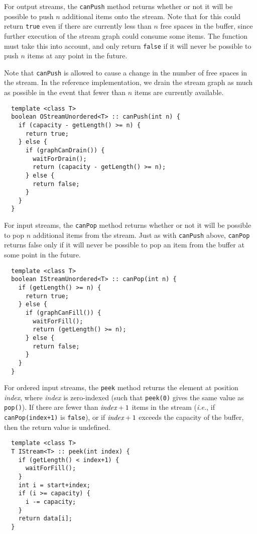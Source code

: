  For output streams, the {\tt canPush} method returns
whether or not it will be possible to push $n$ additional items onto
the stream.  Note that for this could return {\tt true} even if there
are currently less than $n$ free spaces in the buffer, since further
execution of the stream graph could consume some items.  The function
must take this into account, and only return {\tt false} if it will
never be possible to push $n$ items at any point in the future.

Note that {\tt canPush} is allowed to cause a change in the number of
free spaces in the stream.  In the reference implementation, we drain
the stream graph as much as possible in the event that fewer than $n$
items are currently available.

{\small
\begin{verbatim}
  template <class T>
  boolean OStreamUnordered<T> :: canPush(int n) {
    if (capacity - getLength() >= n) {
      return true;
    } else {
      if (graphCanDrain()) {
        waitForDrain();
        return (capacity - getLength() >= n);
      } else {
        return false;
      }
    }
  }
\end{verbatim}}

 For input streams, the {\tt canPop} method returns
whether or not it will be possible to pop $n$ additional items from
the stream.  Just as with {\tt canPush} above, {\tt canPop} returns
false only if it will never be possible to pop an item from the buffer
at some point in the future.

{\small
\begin{verbatim}
  template <class T>
  boolean IStreamUnordered<T> :: canPop(int n) {
    if (getLength() >= n) {
      return true;
    } else {
      if (graphCanFill()) {
        waitForFill();
        return (getLength() >= n);
      } else {
        return false;
      }
    }
  }
\end{verbatim}}

 For ordered input streams, the {\tt peek} method returns
the element at position {\it index}, where {\it index} is zero-indexed
(such that {\tt peek(0)} gives the same value as {\tt pop()}).  If
there are fewer than $\mbox{\it index}+1$ items in the stream ({\it i.e.},
if {\tt canPop(index+1)} is {\tt false}), or if $\mbox{\it index}+1$ exceeds
the capacity of the buffer, then the return value is undefined.

{\small
\begin{verbatim}
  template <class T>
  T IStream<T> :: peek(int index) {
    if (getLength() < index+1) {
      waitForFill();
    }
    int i = start+index;
    if (i >= capacity) {
      i -= capacity;
    }
    return data[i];
  }
\end{verbatim}}


